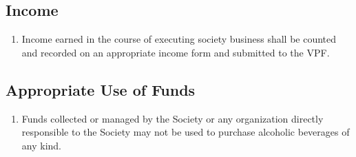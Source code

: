 \subsection{Income}
\begin{enumerate}
\item Income earned in the course of executing society business shall be counted and recorded on an appropriate income form and submitted to the VPF.
\end{enumerate}

\subsection{Appropriate Use of Funds}
\begin{enumerate}
\item Funds collected or managed by the Society or any organization directly responsible to the Society may not be used to purchase alcoholic beverages of any kind.
\end{enumerate}